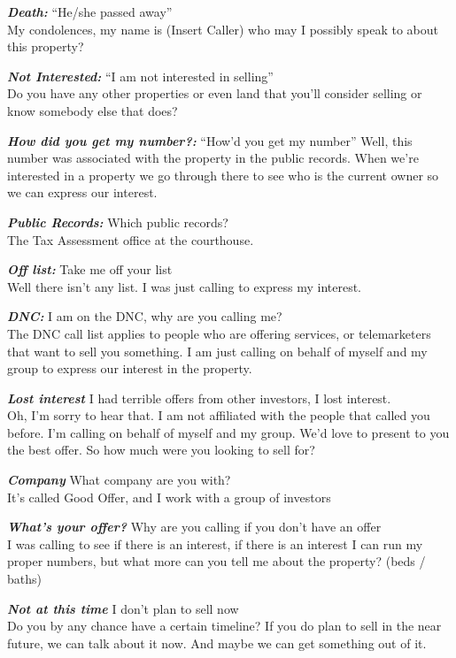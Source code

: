 \documentclass[12pt]{article}
\newcommand{\bb}[1]{\textbf{\textit{#1}}}
\newcommand{\bowner}[1]{{\noindent\color{red} #1}}
\begin{document}
\bowner{\bb{Death:} “He/she passed away”} \\
My condolences, my name is (Insert Caller) who may I possibly speak to about this property?

\bowner{\bb{Not Interested:} “I am not interested in selling”} \\
Do you have any other properties or even land that you’ll consider selling or know somebody else that does? 

\bowner{\bb{How did you get my number?:} “How’d you get my number”}
Well, this number was associated with the property in the public records. When we’re interested in a property we go through there to see who is the current owner so we can express our interest.

\bowner{\bb{Public Records:} Which public records?} \\
The Tax Assessment office at the courthouse.

\bowner{\bb{Off list: } Take me off your list} \\
Well there isn’t any list. I was just calling to express my interest.

\bowner{\bb{DNC\@: } I am on the DNC, why are you calling me?} \\
The DNC call list applies to people who are offering services, or telemarketers that want to sell you something. I am just calling on behalf of myself and my group to express our interest in the property.

\bowner{\bb{Lost interest }I had terrible offers from other investors, I lost interest.} \\
Oh, I’m sorry to hear that. I am not affiliated with the people that called you before. I'm calling on behalf of myself and my group. We’d love to present to you the best offer. So how much were you looking to sell for?


\bowner{\bb{Company} What company are you with?} \\
It's called Good Offer, and I work with a group of investors

\bowner{\bb{What’s your offer?} Why are you calling if you don’t have an offer} \\
I was calling to see if there is an interest, if there is an interest I can run my proper numbers, but what more can you tell me about the property? (beds / baths)

\bowner{\bb{Not at this time} I don't plan to sell now} \\
Do you by any chance have a certain timeline? If you do plan to sell in the near future, we can talk about it now. And maybe we can get something out of it.
\end{document}
